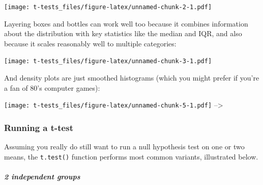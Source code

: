 \documentclass[]{article}
\newenvironment{Shaded}{\begin{snugshade}}{\end{snugshade}}
\newcommand{\KeywordTok}[1]{\textcolor[rgb]{0.13,0.29,0.53}{\textbf{#1}}}
\newcommand{\DataTypeTok}[1]{\textcolor[rgb]{0.13,0.29,0.53}{#1}}
\newcommand{\DecValTok}[1]{\textcolor[rgb]{0.00,0.00,0.81}{#1}}
\newcommand{\StringTok}[1]{\textcolor[rgb]{0.31,0.60,0.02}{#1}}
\newcommand{\OperatorTok}[1]{\textcolor[rgb]{0.81,0.36,0.00}{\textbf{#1}}}
\newcommand{\NormalTok}[1]{#1}
\let\oldsubparagraph\subparagraph
\renewcommand{\subparagraph}[1]{\oldsubparagraph{#1}\mbox{}}
\theoremstyle{definition}
\theoremstyle{definition}
\theoremstyle{definition}
\theoremstyle{remark}
\begin{document}
\texttt{[image: t-tests\_files/figure-latex/unnamed-chunk-2-1.pdf]}

Layering boxes and bottles can work well too because it combines
information about the distribution with key statistics like the median
and IQR, and also because it scales reasonably well to multiple
categories:

\begin{Shaded}
\end{Shaded}

\texttt{[image: t-tests\_files/figure-latex/unnamed-chunk-3-1.pdf]}

And density plots are just smoothed histograms (which you might prefer
if you're a fan of 80's computer games):

\begin{Shaded}
\end{Shaded}

\texttt{[image: t-tests\_files/figure-latex/unnamed-chunk-5-1.pdf]}
--\textgreater{}

\subsubsection*{Running a t-test}\label{running-a-t-test}

Assuming you really do still want to run a null hypothesis test on one
or two means, the \texttt{t.test()} function performs most common
variants, illustrated below.

\subparagraph{2 independent groups}\label{independent-groups}
\end{document}
